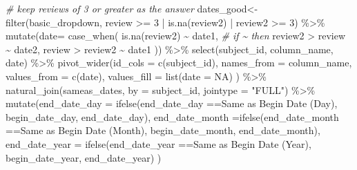 \documentclass[
]{article}
\newenvironment{Shaded}{\begin{snugshade}}{\end{snugshade}}
\newcommand{\AttributeTok}[1]{\textcolor[rgb]{0.77,0.63,0.00}{#1}}
\newcommand{\CommentTok}[1]{\textcolor[rgb]{0.56,0.35,0.01}{\textit{#1}}}
\newcommand{\ConstantTok}[1]{\textcolor[rgb]{0.00,0.00,0.00}{#1}}
\newcommand{\DecValTok}[1]{\textcolor[rgb]{0.00,0.00,0.81}{#1}}
\newcommand{\FunctionTok}[1]{\textcolor[rgb]{0.00,0.00,0.00}{#1}}
\newcommand{\NormalTok}[1]{#1}
\newcommand{\OtherTok}[1]{\textcolor[rgb]{0.56,0.35,0.01}{#1}}
\newcommand{\SpecialCharTok}[1]{\textcolor[rgb]{0.00,0.00,0.00}{#1}}
\newcommand{\StringTok}[1]{\textcolor[rgb]{0.31,0.60,0.02}{#1}}
\begin{document}
\begin{Shaded}
\begin{Highlighting}[]
\CommentTok{\# keep reviews of 3 or greater as the answer  }
\NormalTok{dates\_good}\OtherTok{\textless{}{-}}\FunctionTok{filter}\NormalTok{(basic\_dropdown, review }\SpecialCharTok{\textgreater{}=} \DecValTok{3} \SpecialCharTok{|} \FunctionTok{is.na}\NormalTok{(review2) }\SpecialCharTok{|}\NormalTok{ review2 }\SpecialCharTok{\textgreater{}=} \DecValTok{3}\NormalTok{) }\SpecialCharTok{\%\textgreater{}\%}
  \FunctionTok{mutate}\NormalTok{(}\AttributeTok{date=} \FunctionTok{case\_when}\NormalTok{(}
    \FunctionTok{is.na}\NormalTok{(review2) }\SpecialCharTok{\textasciitilde{}}\NormalTok{ date1, }\CommentTok{\# if \textasciitilde{} then }
\NormalTok{    review2 }\SpecialCharTok{\textgreater{}}\NormalTok{ review }\SpecialCharTok{\textasciitilde{}}\NormalTok{ date2, }
\NormalTok{    review }\SpecialCharTok{\textgreater{}}\NormalTok{ review2 }\SpecialCharTok{\textasciitilde{}}\NormalTok{ date1 }
\NormalTok{  )) }\SpecialCharTok{\%\textgreater{}\%}
  \FunctionTok{select}\NormalTok{(subject\_id, column\_name, date) }\SpecialCharTok{\%\textgreater{}\%} 
  \FunctionTok{pivot\_wider}\NormalTok{(}\AttributeTok{id\_cols =} \FunctionTok{c}\NormalTok{(subject\_id),}
              \AttributeTok{names\_from =}\NormalTok{ column\_name, }
              \AttributeTok{values\_from =} \FunctionTok{c}\NormalTok{(date), }
              \AttributeTok{values\_fill =} \FunctionTok{list}\NormalTok{(}\AttributeTok{date =} \ConstantTok{NA}\NormalTok{) ) }\SpecialCharTok{\%\textgreater{}\%}
  \FunctionTok{natural\_join}\NormalTok{(sameas\_dates, }\AttributeTok{by  =} \StringTok{\textquotesingle{}subject\_id\textquotesingle{}}\NormalTok{, }\AttributeTok{jointype =} \StringTok{"FULL"}\NormalTok{) }\SpecialCharTok{\%\textgreater{}\%} 
  \FunctionTok{mutate}\NormalTok{(}\AttributeTok{end\_date\_day =} \FunctionTok{ifelse}\NormalTok{(end\_date\_day }\SpecialCharTok{==}\StringTok{\textquotesingle{}Same as Begin Date (Day)\textquotesingle{}}\NormalTok{, begin\_date\_day, end\_date\_day),}
         \AttributeTok{end\_date\_month =}\FunctionTok{ifelse}\NormalTok{(end\_date\_month }\SpecialCharTok{==}\StringTok{\textquotesingle{}Same as Begin Date (Month)\textquotesingle{}}\NormalTok{, begin\_date\_month, end\_date\_month),}
         \AttributeTok{end\_date\_year =} \FunctionTok{ifelse}\NormalTok{(end\_date\_year }\SpecialCharTok{==}\StringTok{\textquotesingle{}Same as Begin Date (Year)\textquotesingle{}}\NormalTok{, begin\_date\_year, end\_date\_year) }
\NormalTok{          )}


\end{Highlighting}
\end{Shaded}
\end{document}
